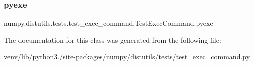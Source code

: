 \subsubsection{\texorpdfstring{pyexe}{pyexe}}
{\footnotesize\ttfamily numpy.\+distutils.\+tests.\+test\+\_\+exec\+\_\+command.\+Test\+Exec\+Command.\+pyexe}



The documentation for this class was generated from the following file\+:\begin{DoxyCompactItemize}
\item 
venv/lib/python3./site-\/packages/numpy/distutils/tests/\hyperlink{test__exec__command_8py}{test\+\_\+exec\+\_\+command.\+py}\end{DoxyCompactItemize}
